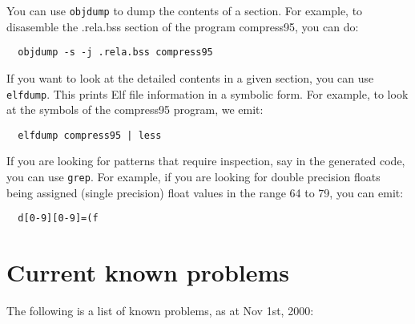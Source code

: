 You can use \verb!objdump! to dump the contents of a section. 
For example, to disasemble the .rela.bss section of the program 
compress95, you can do: 
\begin{verbatim}
  objdump -s -j .rela.bss compress95
\end{verbatim}

If you want to look at the detailed contents in a given section, 
you can use \verb!elfdump!.  This prints Elf file information in 
a symbolic form.   For example, to look at the symbols of the 
compress95 program, we emit: 
\begin{verbatim}
  elfdump compress95 | less
\end{verbatim}

If you are looking for patterns that require inspection, say in the 
generated code, you can use \verb!grep!.  For example, if you are 
looking for double precision floats being assigned (single precision)
float values in the range 64 to 79, you can emit: 
\begin{verbatim}
  d[0-9][0-9]=(f
\end{verbatim}


\section{Current known problems}
The following is a list of known problems, as at Nov 1st, 2000: 

